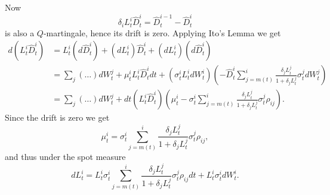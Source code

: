 Now
\[
  \delta_i L_t^i \hat{D}_t^{i} =  \hat{D}_t^{i-1} - \hat{D}_t^{i}  
\]
is also a $Q$-martingale, hence its drift is zero. Applying Ito's Lemma we
get
\begin{align*}
  d( L_t^i \hat{D}_t^{i} )
    &= L_t^i (d\hat{D}_t^{i}) + (dL_t^i) \hat{D}_t^{i} 
      +  (dL_t^i) (d\hat{D}_t^{i})   \\
    &= \sum_j (\dots) dW_t^j + \mu_t^i L_t^i \hat{D}_t^{i} dt
      + (\sigma_t^i L_t^i dW_t^i) 
        \left( - \hat{D}_t^{i} \sum_{j=m(t)}^i
          \frac{\delta_j L_t^j}{1+\delta_j L_t^j} \sigma_t^j dW_t^j \right) \\
    &= \sum_j (\dots) dW_t^j 
      + dt (L_t^i \hat{D}_t^{i}) 
       \left( \mu_t^i 
          - \sigma_t^i \sum_{j=m(t)}^i \frac{\delta_j L_t^j}{1+\delta_j L_t^j} \sigma_t^j \rho_{ij}
       \right).
\end{align*}
Since the drift is zero we get
\begin{equation}
  \mu_t^i = \sigma_t^i \sum_{j=m(t)}^i \frac{\delta_j L_t^j}{1+\delta_j L_t^j} \sigma_t^j \rho_{ij},
\end{equation}
and thus under the spot measure
\begin{equation}
  dL_t^i 
    = L_t^i \sigma_t^i 
      \sum_{j=m(t)}^i \frac{\delta_j L_t^j}{1+\delta_j L_t^j} \sigma_t^j \rho_{ij} dt
      + L_t^i \sigma_t^i dW_t^i.
\end{equation}

